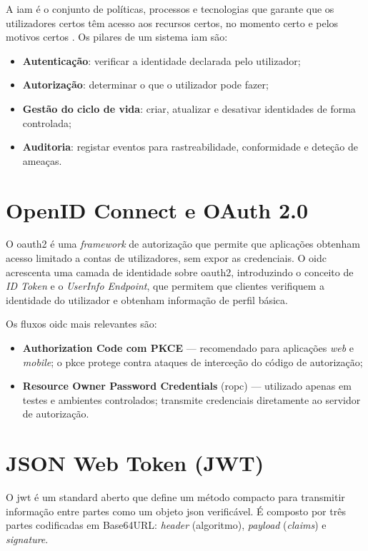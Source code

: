 A \gls{iam} é o conjunto de políticas, processos e tecnologias que garante que os utilizadores certos têm acesso aos recursos certos, no momento certo e pelos motivos certos \cite{NIST80063B}. Os pilares de um sistema \gls{iam} são:

\begin{itemize}
  \item \textbf{Autenticação}: verificar a identidade declarada pelo utilizador;
  \item \textbf{Autorização}: determinar o que o utilizador pode fazer;
  \item \textbf{Gestão do ciclo de vida}: criar, atualizar e desativar identidades de forma controlada;
  \item \textbf{Auditoria}: registar eventos para rastreabilidade, conformidade e deteção de ameaças.
\end{itemize}

\section{OpenID Connect e OAuth 2.0}

O \gls{oauth2} \cite{RFC6749} é uma \textit{framework} de autorização que permite que aplicações obtenham acesso limitado a contas de utilizadores, sem expor as credenciais. O \gls{oidc} \cite{OIDCCore} acrescenta uma camada de identidade sobre \gls{oauth2}, introduzindo o conceito de \textit{ID Token} e o \textit{UserInfo Endpoint}, que permitem que clientes verifiquem a identidade do utilizador e obtenham informação de perfil básica.

Os fluxos \gls{oidc} mais relevantes são:
\begin{itemize}
  \item \textbf{Authorization Code com PKCE} \cite{RFC7636} — recomendado para aplicações \textit{web} e \textit{mobile}; o \gls{pkce} protege contra ataques de interceção do código de autorização;
  \item \textbf{Resource Owner Password Credentials} (\gls{ropc}) — utilizado apenas em testes e ambientes controlados; transmite credenciais diretamente ao servidor de autorização.
\end{itemize}

\section{JSON Web Token (JWT)}

O \gls{jwt} \cite{RFC7519} é um standard aberto que define um método compacto para transmitir informação entre partes como um objeto \gls{json} verificável. É composto por três partes codificadas em Base64URL: \textit{header} (algoritmo), \textit{payload} (\textit{claims}) e \textit{signature}.

